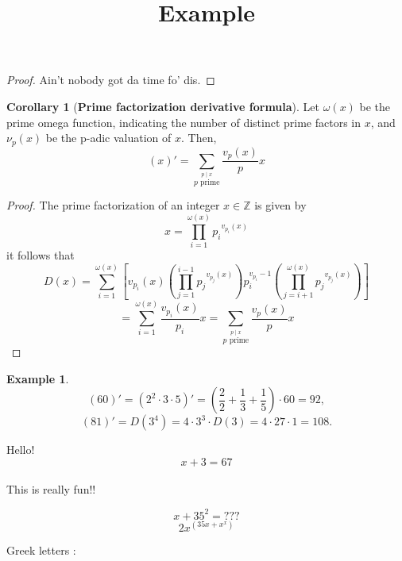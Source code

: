 \documentclass[12pt a]{article}
\theoremstyle{definition}
\newtheorem{corollary}{Corollary}
\theoremstyle{definition}
\theoremstyle{definition}
\newtheorem{example}{Example}
\begin{document}
\begin{proof}
Ain't nobody got da time fo' dis. 
\end{proof}


\begin{corollary}[\textbf{Prime factorization derivative formula}]
Let $\omega(x)$ be the prime omega function, indicating the number of distinct prime factors in $x$, and $\nu_{p}(x)$ be the p-adic valuation of $x$. Then, 
$$
(x)' = \sum _{\stackrel {p\mid x}{p{\text{ prime}}}}{\frac {v_{p}(x)}{p}}x
$$
\end{corollary}

\begin{proof}
The prime factorization of an integer $x\in \mathbb{Z}$ is given by 
$$
{\displaystyle x=\prod _{i=1}^{\omega (x)}{p_{i}}^{v_{p_{i}}(x)}}
$$
it follows that 
$$
\displaystyle D(x)=\sum _{i=1}^{\omega (x)}\left[v_{p_{i}}(x)\left(\prod _{j=1}^{i-1}{p_{j}}^{v_{p_{j}}(x)}\right)p_{i}^{v_{p_{i}}-1}\left(\prod _{j=i+1}^{\omega (x)}{p_{j}}^{v_{p_{j}}(x)}\right)\right]
$$
$$
=\sum _{i=1}^{\omega (x)}{\frac {v_{p_{i}}(x)}{p_{i}}}x=\sum _{\stackrel {p\mid x}{p{\text{ prime}}}}{\frac {v_{p}(x)}{p}}x
$$
\end{proof}


\begin{example}
$$
{\displaystyle (60)'=(2^{2}\cdot 3\cdot 5)'=\left({\frac {2}{2}}+{\frac {1}{3}}+{\frac {1}{5}}\right)\cdot 60=92,}
$$
$$
{\displaystyle (81)'=D(3^{4})=4\cdot 3^{3}\cdot D(3)=4\cdot 27\cdot 1=108.}
$$
\end{example}





\title{Example}


Hello! \\
$$x+3= 67$$ \\
 
This is really fun!! 

$$ x + 35^2 = ??? $$
$$ 2x^{(35x+x^x)} $$
 
Greek letters : 
\end{document}
